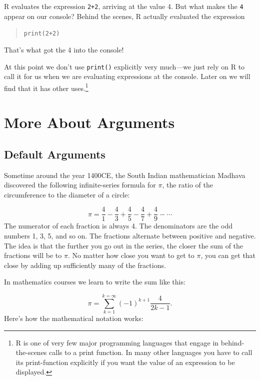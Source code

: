\documentclass[]{book}
\let\rmarkdownfootnote\footnote%
\def\footnote{\protect\rmarkdownfootnote}
\theoremstyle{definition}
\theoremstyle{definition}
\theoremstyle{definition}
\theoremstyle{remark}
\begin{document}
{R evaluates the expression \texttt{2+2}, arriving at the value 4. But
what makes the \texttt{4} appear on our console? Behind the scenes, R
actually evaluated the expression

\begin{quote}
\texttt{print(2+2)}
\end{quote}

That's what got the 4 into the console!

At this point we don't use \texttt{print()} explicitly very much---we
just rely on R to call it for us when we are evaluating expressions at
the console. Later on we will find that it has other uses.\footnote{R is
  one of very few major programming languages that engage in
  behind-the-scenes calls to a print function. In many other languages
  you have to call its print-function explicitly if you want the value
  of an expression to be displayed.}

\section{More About Arguments}\label{more-about-arguments}

\subsection{Default Arguments}\label{default-arguments}

Sometime around the year 1400CE, the South Indian mathematician Madhava
discovered the following infinite-series formula for \(\pi\), the ratio
of the circumference to the diameter of a circle:

\[\pi = \frac{4}{1} - \frac{4}{3} + \frac{4}{5} - \frac{4}{7} +\frac{4}{9} - \cdots\]
The numerator of each fraction is always 4. The denominators are the odd
numbers 1, 3, 5, and so on. The fractions alternate between positive and
negative. The idea is that the further you go out in the series, the
closer the sum of the fractions will be to \(\pi\). No matter how close
you want to get to \(\pi\), you can get that close by adding up
sufficiently many of the fractions.

In mathematics courses we learn to write the sum like this:

\[\pi = \sum_{k=1}^{k=\infty} (-1)^{k+1}\frac{4}{2k-1}.\] Here's how the
mathematical notation works:

}
\end{document}
